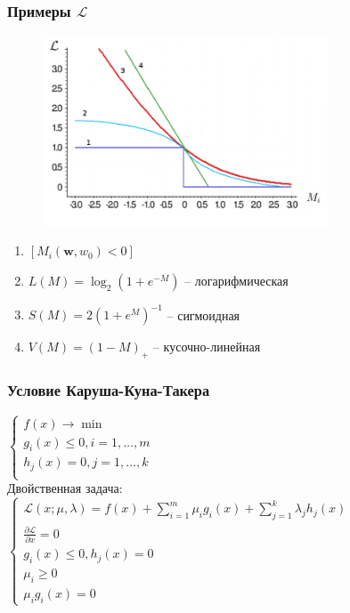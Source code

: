 \documentclass[12pt]{beamer}
\begin{document}
\begin{frame}\frametitle{Примеры $\mathcal{L}$}
\begin{figure}[htbp]
  \includegraphics[height=160pt, keepaspectratio = true]{images/l}
\end{figure}
\begin{enumerate}
\item $\left[M_i(\mathbf{w}, w_0) < 0 \right]$
\item $L(M) = \log_2(1+e^{-M})$ -- логарифмическая
\item $S(M) = 2(1+e^M)^{-1}$ -- сигмоидная
\item $V(M) = (1-M)_+$ -- кусочно-линейная
\end{enumerate}
\end{frame}

\begin{frame}\frametitle{Условие Каруша-Куна-Такера}
$\begin{cases}
f(x) \rightarrow \min\\
g_i(x) \leq 0 , i = 1, \dots, m\\
h_j(x) = 0 , j = 1, \dots, k\\
\end{cases}$\\
Двойственная задача:\\
$\begin{cases}
\mathcal{L}(x; \mu, \lambda) = f(x) + \sum\limits_{i = 1}^m \mu_ig_i(x) + \sum\limits_{j = 1}^k \lambda_jh_j(x)\\
\frac{\partial \mathcal{L}}{\partial x} = 0\\
g_i(x) \leq 0 , h_j(x) = 0\\
\mu_i \geq 0\\
\mu_ig_i(x) = 0
\end{cases}$\\

\end{frame}
\end{document}
